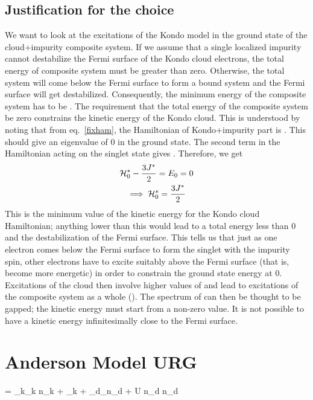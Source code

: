 \documentclass[14pt]{extarticle}
\numberwithin{equation}{section}
\begin{document}
{\subsection*{Justification for the choice }
We want to look at the excitations of the Kondo model in the ground state of the cloud+impurity composite system.
If we assume that a single localized impurity cannot destabilize the Fermi surface of the Kondo cloud electrons, the total energy of composite system must be greater than zero.
Otherwise, the total system will come below the Fermi surface to form a bound system and the Fermi surface will get destabilized.
Consequently, the minimum energy of the composite system has to be .
\pb
The requirement that the total energy of the composite system be zero constrains the kinetic energy of the Kondo cloud.
This is understood by noting that from eq.~\ref{fixham}, the Hamiltonian of Kondo+impurity part is .
This should give an eigenvalue of 0 in the ground state.
The second term in the Hamiltonian acting on the singlet state gives .
Therefore, we get
\begin{gather}
\mathcal{H}_0^* -\frac{3J^*}{2} = E_0 = 0 \\
\implies \mathcal{H}_0^s = \frac{3J^*}{2}
\end{gather}
This is the minimum value of the kinetic energy for the Kondo cloud Hamiltonian; anything lower than this would lead to a total energy  less than 0 and the destabilization of the Fermi surface.
This tells us that just as one electron comes below the Fermi surface to form the singlet with the impurity spin, other electrons have to excite suitably above the Fermi surface (that is, become more energetic) in order to constrain the ground state energy at 0.
Excitations of the cloud then involve higher values of  and lead to excitations of the composite system as a whole ().
The spectrum of  can then be thought to be gapped; the kinetic energy must start from a non-zero value.
It is not possible to have a kinetic energy infinitesimally close to the Fermi surface.


\pagebreak\section{Anderson Model URG}
\beq
\ham = \sum_{k\sigma}\epsilon_k \hat n_{k\sigma} + \sum_{k\sigma}  + \epsilon_{d}\sum_\sigma  \hat n_{d\sigma} +  U \hat n_{d\ua} \hat n_{d\da}
\eeq
\comm{
}}
\end{document}
